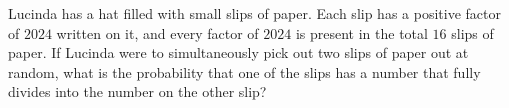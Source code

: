 Lucinda has a hat filled with small slips of paper. Each slip has a positive factor of $2024$ written on it, and every factor of $2024$ is present in the total $16$ slips of paper. If Lucinda were to simultaneously pick out two slips of paper out at random, what is the probability that one of the slips has a number that fully divides into the number on the other slip?
